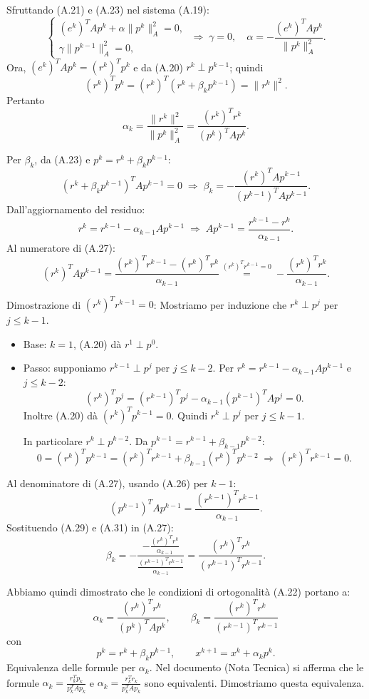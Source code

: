 \documentclass[a4paper,12pt]{article}
\begin{document}
Sfruttando (A.21) e (A.23) nel sistema (A.19):
\[
\begin{cases}
(e^k)^T A p^k+\alpha\|p^k\|_A^2=0,\\
\gamma\|p^{k-1}\|_A^2=0,
\end{cases}
\;\Longrightarrow\;
\gamma=0,\quad
\alpha=-\frac{(e^k)^T A p^k}{\|p^k\|_A^2}. \tag{A.24}
\]
Ora, \((e^k)^T A p^k=(r^k)^T p^k\) e da (A.20) \(r^k\perp p^{k-1}\); quindi
\[
(r^k)^T p^k=(r^k)^T(r^k+\beta_k p^{k-1})=\|r^k\|^2. \tag{A.25}
\]
Pertanto
\[
\alpha_k=\frac{\|r^k\|^2}{\|p^k\|_A^2}
=\frac{(r^k)^T r^k}{(p^k)^T A p^k}. \tag{A.26}
\]

Per \(\beta_k\), da (A.23) e \(p^k=r^k+\beta_k p^{k-1}\):
\[
(r^k+\beta_k p^{k-1})^T A p^{k-1}=0
\;\Longrightarrow\;
\beta_k=-\frac{(r^k)^T A p^{k-1}}{(p^{k-1})^T A p^{k-1}}. \tag{A.27}
\]
Dall'aggiornamento del residuo:
\[
r^k=r^{k-1}-\alpha_{k-1}A p^{k-1}
\;\Longrightarrow\;
A p^{k-1}=\frac{r^{k-1}-r^k}{\alpha_{k-1}}. \tag{A.28}
\]
Al numeratore di (A.27):
\[
(r^k)^T A p^{k-1}
=\frac{(r^k)^T r^{k-1}-(r^k)^T r^k}{\alpha_{k-1}}
\overset{(r^k)^T r^{k-1}=0}{=}
-\frac{(r^k)^T r^k}{\alpha_{k-1}}. \tag{A.29}
\]

Dimostrazione di \((r^k)^T r^{k-1}=0\):  
Mostriamo per induzione che \(r^k\perp p^j\) per \(j\le k-1\).
\begin{itemize}
\item Base: \(k=1\), (A.20) dà \(r^1\perp p^0\).
\item Passo: supponiamo \(r^{k-1}\perp p^j\) per \(j\le k-2\). Per \(r^k=r^{k-1}-\alpha_{k-1}A p^{k-1}\) e \(j\le k-2\):
\[
(r^k)^T p^j=(r^{k-1})^T p^j-\alpha_{k-1}(p^{k-1})^T A p^j=0.
\]
Inoltre (A.20) dà \((r^k)^T p^{k-1}=0\). Quindi \(r^k\perp p^j\) per \(j\le k-1\).

In particolare \(r^k\perp p^{k-2}\). Da \(p^{k-1}=r^{k-1}+\beta_{k-1}p^{k-2}\):
\[
0=(r^k)^T p^{k-1}=(r^k)^T r^{k-1}+\beta_{k-1}(r^k)^T p^{k-2}
\;\Longrightarrow\;
(r^k)^T r^{k-1}=0. \tag{A.30}
\]
\end{itemize}

Al denominatore di (A.27), usando (A.26) per \(k-1\):
\[
(p^{k-1})^T A p^{k-1}=\frac{(r^{k-1})^T r^{k-1}}{\alpha_{k-1}}. \tag{A.31}
\]
Sostituendo (A.29) e (A.31) in (A.27):
\[
\beta_k
= -\frac{-\frac{(r^k)^T r^k}{\alpha_{k-1}}}{\frac{(r^{k-1})^T r^{k-1}}{\alpha_{k-1}}}
= \frac{(r^k)^T r^k}{(r^{k-1})^T r^{k-1}}. \tag{A.32}
\]

Abbiamo quindi dimostrato che le condizioni di ortogonalità (A.22) portano a:
\[
\alpha_k=\frac{(r^k)^T r^k}{(p^k)^T A p^k},\qquad
\beta_k=\frac{(r^k)^T r^k}{(r^{k-1})^T r^{k-1}}
\tag{A.33}
\]
con
\[
p^k=r^k+\beta_k p^{k-1},\qquad x^{k+1}=x^k+\alpha_k p^k. \tag{A.34}
\]
\medskip
\noindent
Equivalenza delle formule per $\alpha_k$.
Nel documento (Nota Tecnica) si afferma che le formule $\alpha_k = \frac{r_k^T p_k}{p_k^T A p_k}$ e $\alpha_k = \frac{r_k^T r_k}{p_k^T A p_k}$ sono equivalenti. Dimostriamo questa equivalenza.
\end{document}

